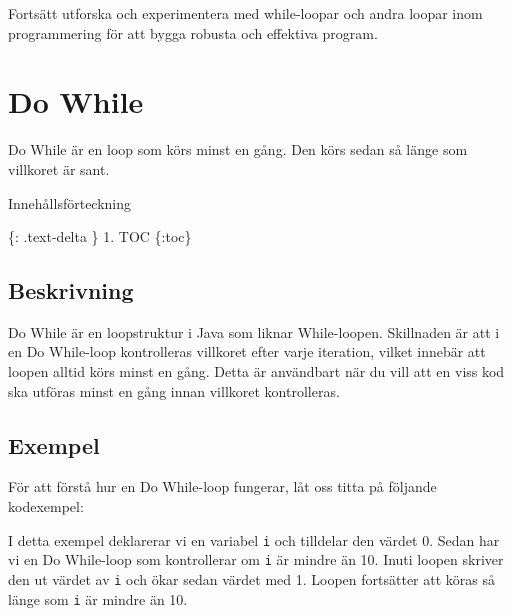 Fortsätt utforska och experimentera med while-loopar och andra loopar
inom programmering för att bygga robusta och effektiva program.

\hypertarget{do-while}{%
\section{Do While}\label{do-while}}

Do While är en loop som körs minst en gång. Den körs sedan så länge som
villkoret är sant.

Innehållsförteckning

\{: .text-delta \} 1. TOC \{:toc\}

\hypertarget{beskrivning}{%
\subsection{Beskrivning}\label{beskrivning}}

Do While är en loopstruktur i Java som liknar While-loopen. Skillnaden
är att i en Do While-loop kontrolleras villkoret efter varje iteration,
vilket innebär att loopen alltid körs minst en gång. Detta är användbart
när du vill att en viss kod ska utföras minst en gång innan villkoret
kontrolleras.

\hypertarget{exempel}{%
\subsection{Exempel}\label{exempel}}

För att förstå hur en Do While-loop fungerar, låt oss titta på följande
kodexempel:

\hypertarget{cb1}{}
\begin{Shaded}
\begin{Highlighting}[]
\OperatorTok{=} \OperatorTok{;}
 \OperatorTok{\{}
    \OperatorTok{(}\OperatorTok{);}
\OperatorTok{++;}
\OperatorTok{\}}  \OperatorTok{(}\OperatorTok{\textless{}} \OperatorTok{);}
\end{Highlighting}
\end{Shaded}

I detta exempel deklarerar vi en variabel \texttt{i} och tilldelar den
värdet 0. Sedan har vi en Do While-loop som kontrollerar om \texttt{i}
är mindre än 10. Inuti loopen skriver den ut värdet av \texttt{i} och
ökar sedan värdet med 1. Loopen fortsätter att köras så länge som
\texttt{i} är mindre än 10.

